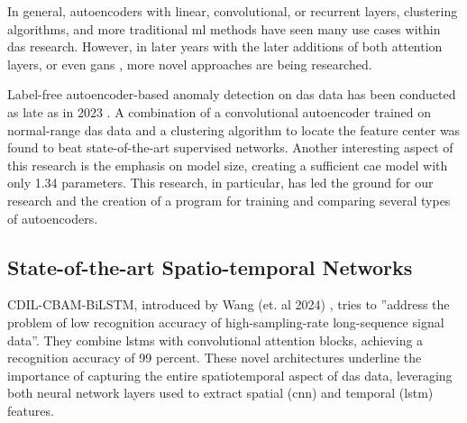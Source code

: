 In general, autoencoders with linear, convolutional, or recurrent layers, clustering algorithms, and more traditional \acrshort{ml} methods have seen many use cases within \acrshort{das} research. However, in later years with the later additions of both attention layers, or even \acrshort{gan}s \cite{goodfellow2014generative, goodfellow2016nips}, more novel approaches are being researched.  

\cite{wang2024deep} 






Label-free autoencoder-based anomaly detection on \acrshort{das} data has been conducted as late as in 2023 \cite{xie2023label}. A combination of a convolutional autoencoder trained on normal-range \acrshort{das} data and a clustering algorithm to locate the feature center was found to beat state-of-the-art supervised networks. Another interesting aspect of this research is the emphasis on model size, creating a sufficient \acrshort{cae} model with only \qty{1.34}{\si{\kilo}} parameters. This research, in particular, has led the ground for our research and the creation of a program for training and comparing several types of autoencoders. \\


\subsection{State-of-the-art Spatio-temporal Networks}

CDIL-CBAM-BiLSTM, introduced by Wang (et. al 2024) \cite{wang2024deep}, tries to ''address the problem of low recognition accuracy of high-sampling-rate long-sequence signal data''. They combine \acrshort{lstm}s with convolutional attention blocks, achieving a recognition accuracy of 99 percent. These novel architectures underline the importance of capturing the entire spatiotemporal aspect of \acrshort{das} data, leveraging both neural network layers used to extract spatial (\acrshort{cnn}) and temporal (\acrshort{lstm}) features.



